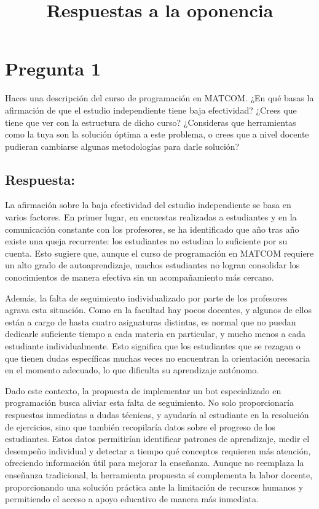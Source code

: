 \documentclass{article}
\title{Respuestas a la oponencia}
\date{}
\begin{document}
\maketitle

\section{Pregunta 1}

Haces una descripción del curso de programación en MATCOM. ¿En qué basas la afirmación de que el estudio independiente tiene baja efectividad? ¿Crees que tiene que ver con la estructura de dicho curso? ¿Consideras que herramientas como la tuya son la solución óptima a este problema, o crees que a nivel docente pudieran cambiarse algunas metodologías para darle solución?

\subsection{Respuesta:}

La afirmación sobre la baja efectividad del estudio independiente se basa en varios factores. En primer lugar, en encuestas realizadas a estudiantes y en la comunicación constante con los profesores, se ha identificado que año tras año existe una queja recurrente: los estudiantes no estudian lo suficiente por su cuenta. Esto sugiere que, aunque el curso de programación en MATCOM requiere un alto grado de autoaprendizaje, muchos estudiantes no logran consolidar los conocimientos de manera efectiva sin un acompañamiento más cercano.

Además, la falta de seguimiento individualizado por parte de los profesores agrava esta situación. Como en la facultad hay pocos docentes, y algunos de ellos están a cargo de hasta cuatro asignaturas distintas, es normal que no puedan dedicarle suficiente tiempo a cada materia en particular, y mucho menos a cada estudiante individualmente. Esto significa que los estudiantes que se rezagan o que tienen dudas específicas muchas veces no encuentran la orientación necesaria en el momento adecuado, lo que dificulta su aprendizaje autónomo.

Dado este contexto, la propuesta de implementar un bot especializado en programación busca aliviar esta falta de seguimiento. No solo proporcionaría respuestas inmediatas a dudas técnicas, y ayudaría al estudiante en la resolución de ejercicios, sino que también recopilaría datos sobre el progreso de los estudiantes. Estos datos permitirían identificar patrones de aprendizaje, medir el desempeño individual y detectar a tiempo qué conceptos requieren más atención, ofreciendo información útil para mejorar la enseñanza. Aunque no reemplaza la enseñanza tradicional, la herramienta propuesta sí complementa la labor docente, proporcionando una solución práctica ante la limitación de recursos humanos y permitiendo el acceso a apoyo educativo de manera más inmediata.
\end{document}
